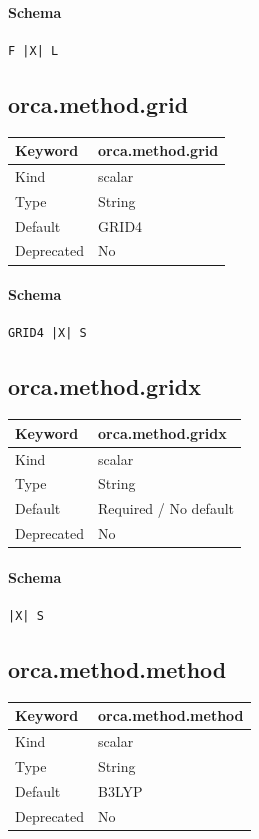 \documentclass[11pt]{article}
\begin{document}
{{{{{\paragraph{Schema}
\begin{Verbatim}
F |X| L
\end{Verbatim}

\subsection{orca.method.grid}
\label{kw:orca-method-grid}
\begin{longtable}{|p{1.5in}|p{4.5in}|}
\hline
Keyword & orca.method.grid \\
\hline
Kind & scalar \\
\hline
Type & String \\
\hline
Default & GRID4 \\
\hline
Deprecated & No \\
\hline
\end{longtable}
\paragraph{Schema}
\begin{Verbatim}
GRID4 |X| S
\end{Verbatim}

\subsection{orca.method.gridx}
\label{kw:orca-method-gridx}
\begin{longtable}{|p{1.5in}|p{4.5in}|}
\hline
Keyword & orca.method.gridx \\
\hline
Kind & scalar \\
\hline
Type & String \\
\hline
Default & Required / No default \\
\hline
Deprecated & No \\
\hline
\end{longtable}
\paragraph{Schema}
\begin{Verbatim}
|X| S
\end{Verbatim}

\subsection{orca.method.method}
\label{kw:orca-method-method}
\begin{longtable}{|p{1.5in}|p{4.5in}|}
\hline
Keyword & orca.method.method \\
\hline
Kind & scalar \\
\hline
Type & String \\
\hline
Default & B3LYP \\
\hline
Deprecated & No \\
\hline
\end{longtable}
}}}}}
\end{document}

